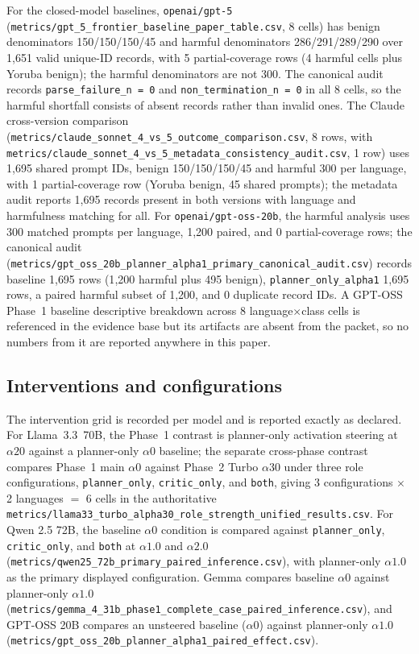 For the closed-model baselines, \texttt{openai/gpt-5}
(\texttt{metrics/gpt\_5\_frontier\_baseline\_paper\_table.csv}, 8 cells) has
benign denominators 150/150/150/45 and harmful denominators 286/291/289/290 over
1{,}651 valid unique-ID records, with 5 partial-coverage rows (4 harmful cells
plus Yoruba benign); the harmful denominators are not 300. The canonical audit
records \texttt{parse\_failure\_n = 0} and \texttt{non\_termination\_n = 0} in all
8 cells, so the harmful shortfall consists of absent records rather than invalid
ones. The Claude cross-version comparison
(\texttt{metrics/claude\_sonnet\_4\_vs\_5\_outcome\_comparison.csv}, 8 rows,
with \texttt{metrics/claude\_sonnet\_4\_vs\_5\_metadata\_consistency\_audit.csv},
1 row) uses 1{,}695 shared prompt IDs, benign 150/150/150/45 and harmful 300 per
language, with 1 partial-coverage row (Yoruba benign, 45 shared prompts); the
metadata audit reports 1{,}695 records present in both versions with language and
harmfulness matching for all. For \texttt{openai/gpt-oss-20b}, the harmful
analysis uses 300 matched prompts per language, 1{,}200 paired, and 0
partial-coverage rows; the canonical audit
(\texttt{metrics/gpt\_oss\_20b\_planner\_alpha1\_primary\_canonical\_audit.csv})
records baseline 1{,}695 rows (1{,}200 harmful plus 495 benign),
\texttt{planner\_only\_alpha1} 1{,}695 rows, a paired harmful subset of 1{,}200,
and 0 duplicate record IDs. A GPT-OSS Phase~1 baseline descriptive breakdown
across 8 language$\times$class cells is referenced in the evidence base but its
artifacts are absent from the packet, so no numbers from it are reported
anywhere in this paper.

\subsection{Interventions and configurations}

The intervention grid is recorded per model and is reported exactly as declared.
For Llama~3.3~70B, the Phase~1 contrast is planner-only activation steering at
$\alpha20$ against a planner-only $\alpha0$ baseline; the separate cross-phase
contrast compares Phase~1 main $\alpha0$ against Phase~2 Turbo $\alpha30$ under
three role configurations, \texttt{planner\_only}, \texttt{critic\_only}, and
\texttt{both}, giving 3 configurations $\times$ 2 languages $=$ 6 cells in the
authoritative
\texttt{metrics/llama33\_turbo\_alpha30\_role\_strength\_unified\_results.csv}.
For Qwen 2.5 72B, the baseline $\alpha0$ condition is compared against
\texttt{planner\_only}, \texttt{critic\_only}, and \texttt{both} at $\alpha1.0$
and $\alpha2.0$ (\texttt{metrics/qwen25\_72b\_primary\_paired\_inference.csv}),
with planner-only $\alpha1.0$ as the primary displayed configuration. Gemma
compares baseline $\alpha0$ against planner-only $\alpha1.0$
(\texttt{metrics/gemma\_4\_31b\_phase1\_complete\_case\_paired\_inference.csv}),
and GPT-OSS 20B compares an unsteered baseline ($\alpha0$) against planner-only
$\alpha1.0$
(\texttt{metrics/gpt\_oss\_20b\_planner\_alpha1\_paired\_effect.csv}).

